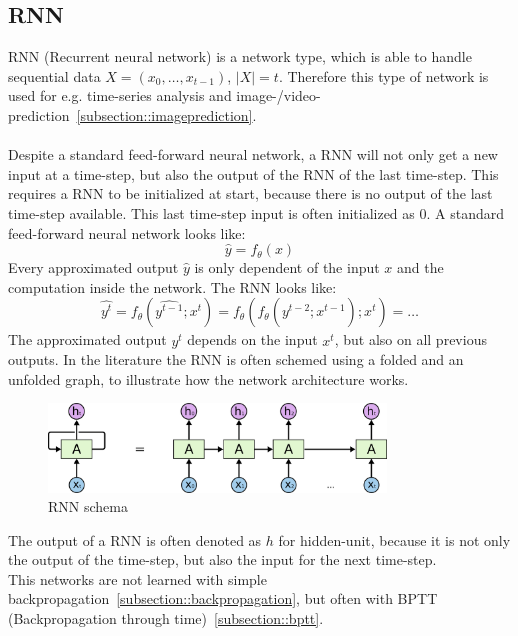  \subsection{RNN} \label{subsection::rnn}
  RNN (Recurrent neural network) is a network type, which is able to handle sequential data $X = (x_0, \ldots, x_{t-1})$, $|X| = t$. Therefore this type of network is used for e.g. time-series 
  analysis and image-/video-prediction~\ref{subsection::imageprediction}.\\\\
  Despite a standard feed-forward neural network, a RNN will not only get a new input at a time-step, but also the output
  of the RNN of the last time-step. This requires a RNN to be initialized at start, because there is no output of the last time-step available. This last time-step input is often initialized as $0$.
  A standard feed-forward neural network looks like:
  \begin{equation}
   \hat{y} = f_{\theta}(x)
  \end{equation}
  Every approximated output $\hat{y}$ is only dependent of the input $x$ and the computation inside the network.
  The RNN looks like:
  \begin{equation}
   \hat{y^t} = f_{\theta}(\hat{y^{t-1}};x^t) = f_{\theta}(f_{\theta}(\hat{y^{t-2}};x^{t-1});x^t) = \ldots
  \end{equation}
  The approximated output $\hat{y^t}$ depends on the input $x^t$, but also on all previous outputs.
  In the literature the RNN is often schemed using a folded and an unfolded graph, to illustrate how the network architecture works.
  \begin{figure}[H]
   \includegraphics[width=0.8\textwidth]{../Images/rnn.png}
   \centering
   \caption{RNN schema \cite{Olah2015}}
   \label{fig:lstm_architecture}
  \end{figure}\noindent
  The output of a RNN is often denoted as $h$ for hidden-unit, because it is not only the output of the time-step, but also the input for the next time-step. \label{sentence::hidden}\\
  This networks are not learned with simple backpropagation~\ref{subsection::backpropagation}, but often with BPTT (Backpropagation through time)~\ref{subsection::bptt}.
 
